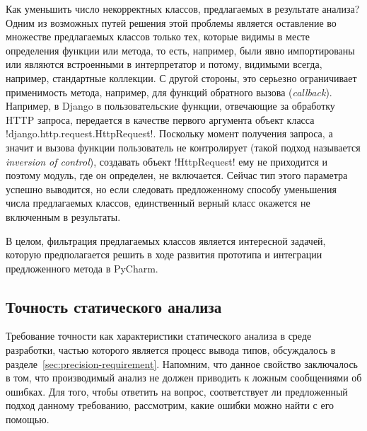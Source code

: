 Как уменьшить число некорректных классов, предлагаемых в результате анализа? 
Одним из возможных путей решения этой проблемы является оставление во множестве
предлагаемых классов только тех, которые видимы в месте определения функции или
метода, то есть, например, были явно импортированы или являются встроенными в
интерпретатор и потому, видимыми всегда, например, стандартные коллекции.
С другой стороны, это серьезно ограничивает применимость метода, например, для
функций обратного вызова (\emph{callback}). Например, в Django в
пользовательские функции, отвечающие за обработку HTTP запроса, передается в
качестве первого аргумента объект класса
!django.http.request.HttpRequest!. Поскольку момент получения запроса, а значит
и вызова функции пользователь не контролирует (такой подход называется
\emph{inversion of control}), создавать объект !HttpRequest! ему не приходится
и поэтому модуль, где он определен, не включается. Сейчас тип этого параметра
успешно выводится, но если следовать предложенному способу уменьшения числа
предлагаемых классов, единственный верный класс окажется не включенным в
результаты.

В целом, фильтрация предлагаемых классов является интересной задачей, которую
предполагается решить в ходе развития прототипа и интеграции предложенного
метода в PyCharm.

\subsection{Точность статического анализа}
\label{sub:static-analysis-precision}

Требование точности как характеристики статического анализа в среде разработки,
частью которого является процесс вывода типов, обсуждалось в
разделе~\ref{sec:precision-requirement}. Напомним, что данное свойство
заключалось в том, что производимый анализ не должен приводить к ложным
сообщениями об ошибках. Для того, чтобы ответить на вопрос, соответствует ли
предложенный подход данному требованию, рассмотрим, какие ошибки можно найти с
его помощью. 

